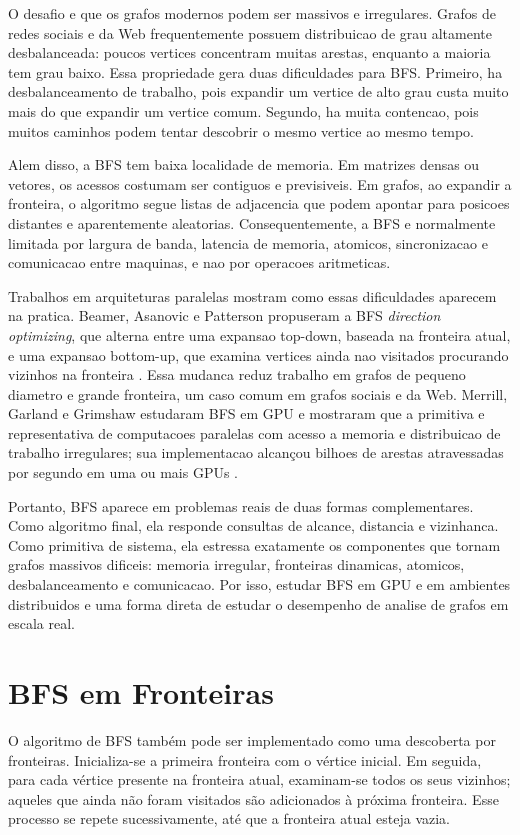\documentclass{article}
\begin{document}
O desafio e que os grafos modernos podem ser massivos e irregulares. Grafos de
redes sociais e da Web frequentemente possuem distribuicao de grau altamente
desbalanceada: poucos vertices concentram muitas arestas, enquanto a maioria tem
grau baixo. Essa propriedade gera duas dificuldades para BFS. Primeiro, ha
desbalanceamento de trabalho, pois expandir um vertice de alto grau custa muito
mais do que expandir um vertice comum. Segundo, ha muita contencao, pois muitos
caminhos podem tentar descobrir o mesmo vertice ao mesmo tempo.

Alem disso, a BFS tem baixa localidade de memoria. Em matrizes densas ou
vetores, os acessos costumam ser contiguos e previsiveis. Em grafos, ao
expandir a fronteira, o algoritmo segue listas de adjacencia que podem apontar
para posicoes distantes e aparentemente aleatorias. Consequentemente, a BFS e
normalmente limitada por largura de banda, latencia de memoria, atomicos,
sincronizacao e comunicacao entre maquinas, e nao por operacoes aritmeticas.

Trabalhos em arquiteturas paralelas mostram como essas dificuldades aparecem na
pratica. Beamer, Asanovic e Patterson propuseram a BFS \textit{direction
optimizing}, que alterna entre uma expansao top-down, baseada na fronteira
atual, e uma expansao bottom-up, que examina vertices ainda nao visitados
procurando vizinhos na fronteira \cite{beamerbfs}. Essa mudanca reduz trabalho
em grafos de pequeno diametro e grande fronteira, um caso comum em grafos
sociais e da Web. Merrill, Garland e Grimshaw estudaram BFS em GPU e mostraram
que a primitiva e representativa de computacoes paralelas com acesso a memoria e
distribuicao de trabalho irregulares; sua implementacao alcançou bilhoes de
arestas atravessadas por segundo em uma ou mais GPUs \cite{merrillgpu}.

Portanto, BFS aparece em problemas reais de duas formas complementares. Como
algoritmo final, ela responde consultas de alcance, distancia e vizinhanca. Como
primitiva de sistema, ela estressa exatamente os componentes que tornam grafos
massivos dificeis: memoria irregular, fronteiras dinamicas, atomicos,
desbalanceamento e comunicacao. Por isso, estudar BFS em GPU e em ambientes
distribuidos e uma forma direta de estudar o desempenho de analise de grafos em
escala real.

\section{BFS em Fronteiras}
O algoritmo de BFS também pode ser implementado como uma descoberta por fronteiras. Inicializa-se a primeira fronteira com o vértice inicial. Em seguida, para cada vértice presente na fronteira atual, examinam-se todos os seus vizinhos; aqueles que ainda não foram visitados são adicionados à próxima fronteira. Esse processo se repete sucessivamente, até que a fronteira atual esteja vazia.
\end{document}
